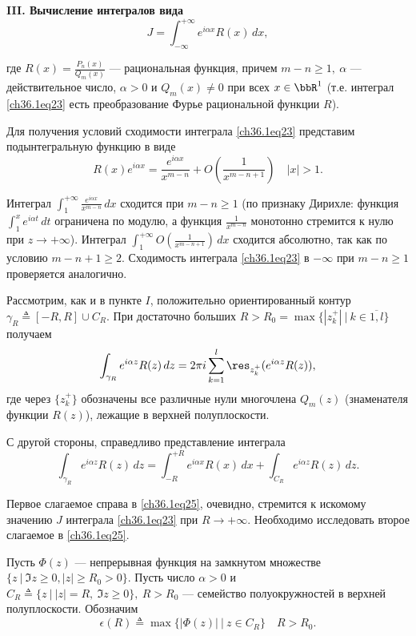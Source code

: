 \begin{leftbar}
{\bf III. Вычисление интегралов вида}
\begin{equation} \label{ch36.1eq23}
J = \int_{-\infty}^{+\infty} e^{i\alpha x} R(x) \,dx,
\end{equation}

где $R(x) = \frac{P_n(x)}{Q_m(x)}$ --- рациональная функция, причем $m - n \ge 1, \: \alpha$ --- действительное число, $\alpha > 0$ и $Q_m(x) \not= 0$ при всех $x \in \bbR^1$ (т.е. интеграл \eqref{ch36.1eq23} есть преобразование Фурье рациональной функции $R$).

Для получения условий сходимости интеграла \eqref{ch36.1eq23} представим подынтегральную функцию в виде
$$
R(x) e^{i \alpha x} = \frac{e^{i \alpha x}}{x^{m - n}} + O \left( \frac{1}{x^{m - n + 1}} \right) \quad |x| > 1.
$$

Интеграл $\int_1^{+\infty} \frac{e^{i \alpha x}}{x^{m - n}} \,dx$ сходится при $m - n \ge 1$ (по признаку Дирихле: функция $\int_1^x e^{i\alpha t}\,dt$ ограничена по модулю, а функция $\frac{1}{x^{m - n}}$ монотонно стремится к нулю при $z \to +\infty$). Интеграл 
$\int_{1}^{+\infty} O \left( \frac{1}{x^{m - n + 1}} \right)\,dx$ сходится абсолютно, так как по условию $m - n + 1 \ge 2$. Сходимость интеграла \eqref{ch36.1eq23} в $-\infty$ при $m - n \ge 1$ проверяется аналогично.

Рассмотрим, как и в пункте $I$, положительно ориентированный контур $\gamma_R \triangleq [-R,R] \cup C_R$. При достаточно больших $R > R_0 = \max \{ |z_k^+| \: \big| \: k \in \overline{1,l} \}$ получаем
\begin{equation} \label{ch36.1eq24}
\int_{\gamma_R} e^{i \alpha z}R(z) \,dz = 2\pi i \sum_{k = 1}^l \res_{z_k^+} (e^{i\alpha z}R(z)),
\end{equation}
где через $\{ z_k^+ \}$ обозначены все различные нули многочлена $Q_m(z)$ (знаменателя функции $R(z)$), лежащие в верхней полуплоскости.

С другой стороны, справедливо представление интеграла 
\begin{equation} \label{ch36.1eq25}
\int_{\gamma_R} e^{i \alpha z}R(z)\,dz = \int_{-R}^{+R} e^{i \alpha x}R(x)\,dx + \int_{C_R} e^{i \alpha z} R(z)\,dz.
\end{equation}

Первое слагаемое справа в \eqref{ch36.1eq25}, очевидно, стремится к искомому значению $J$ интеграла \eqref{ch36.1eq23} при $R \to +\infty$. Необходимо исследовать второе слагаемое в \eqref{ch36.1eq25}.

\begin{lemm} [Жордана] \label{ch36.1lemm5}
Пусть $\Phi(z)$ --- непрерывная функция на замкнутом множестве $\{ z \: \big| \: \Im z \ge 0, |z| \ge R_0 > 0 \}$. Пусть число $\alpha > 0$ и $C_R \triangleq \{ z \: \big| \: |z| = R, \: \Im z \ge 0 \}, \: R > R_0$ --- семейство полуокружностей в верхней полуплоскости. Обозначим
$$
\epsilon(R) \triangleq \max \{ |\Phi(z)| \: \big| \: z \in C_R \} \quad R > R_0.
$$


\end{lemm}
\end{leftbar}
